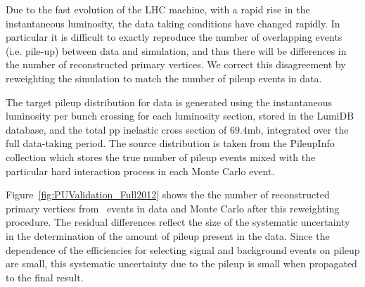 Due to the fast evolution of the LHC machine, with a rapid rise in the
instantaneous luminosity, the data taking conditions have changed
rapidly.  In particular it is difficult to exactly reproduce the
number of overlapping events (i.e. pile-up) between data and
simulation, and thus there will be differences in the number of
reconstructed primary vertices. We correct this disagreement by
reweighting the simulation to match the number of pileup events in data. 

The target pileup distribution for data is generated using the instantaneous luminosity 
per bunch crossing for each luminosity section, stored in the LumiDB database, 
and the total pp inelastic cross section of $69.4$mb, integrated over the 
full data-taking period. 
The source distribution is taken from the PileupInfo
collection which stores the true number of pileup events mixed with the 
particular hard interaction process in each Monte Carlo event. 



Figure~\ref{fig:PUValidation_Full2012} shows the 
the number of reconstructed primary vertices from \dyll\ events in 
data and Monte Carlo after this reweighting procedure. 
The residual differences reflect the size of the systematic uncertainty in the determination 
of the amount of pileup present in the data. Since the dependence 
of the efficiencies for selecting signal and background events on 
pileup are small, this systematic uncertainty due to the pileup 
is small when propagated to the final 
result.

